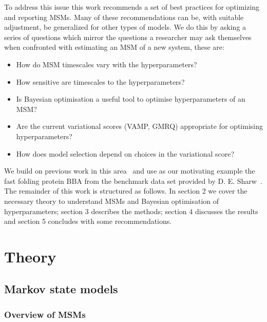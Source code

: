 \documentclass[journal=jacsat,manuscript=article]{achemso}
\begin{document}
To address this issue this work recommends a set of best practices for optimizing and reporting MSMs. Many of these recommendations can be, with suitable adjustment, be generalized for other types of models. We do this by asking a series of questions which mirror the questions a researcher may ask themselves when confronted with estimating an MSM of a new system, these are: 

\begin{itemize}
    \item How do MSM timescales vary with the hyperparameters? 
    \item How sensitive are timescales to the hyperparameters? 
    \item Is Bayesian optimisation a useful tool to optimise hyperparameters of an MSM? 
    \item Are the current variational scores (VAMP, GMRQ) appropriate for optimising hyperparameters? 
    \item How does model selection depend on choices in the variational score? 
\end{itemize}

We build on previous work in this area~\cite{Optimized_2016} and use as our motivating example the fast folding protein BBA from the benchmark data set provided by D. E. Sharw~\cite{lindorff-larsen_how_2011}. 
The remainder of this work is structured as follows.  In section 2 we cover the necessary theory to understand MSMs and Bayesian optimisation of hyperparameters; section 3 describes the methods; section 4 discusses the results and section 5 concludes with some recommendations. 

\section{Theory}\label{theory}
\subsection{Markov state models}
\subsubsection{Overview of MSMs}
\end{document}
